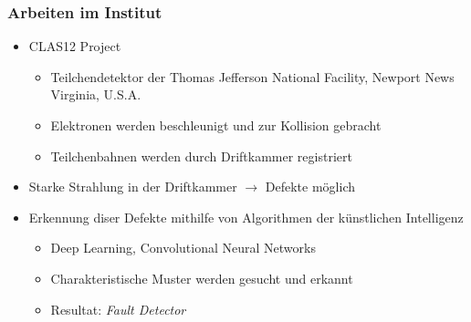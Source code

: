 \documentclass[ngerman, t]{beamer}
\begin{document}
\begin{frame}
  \frametitle{Arbeiten im Institut}
  \begin{itemize}
    \item CLAS12 Project
      \begin{itemize}
        \item Teilchendetektor der Thomas Jefferson National Facility,
          Newport News Virginia, U.S.A.
        \item Elektronen werden beschleunigt und zur Kollision
          gebracht
        \item Teilchenbahnen werden durch Driftkammer registriert
      \end{itemize}
    \item Starke Strahlung in der Driftkammer \(\rightarrow\) Defekte
      m\"oglich
    \item Erkennung diser Defekte mithilfe von Algorithmen der
      k\"unstlichen Intelligenz
      \begin{itemize}
        \item Deep Learning, Convolutional Neural Networks
        \item Charakteristische Muster werden gesucht und erkannt
        \item Resultat: \textit{Fault Detector}
      \end{itemize}
  \end{itemize}
\end{frame}
\end{document}
